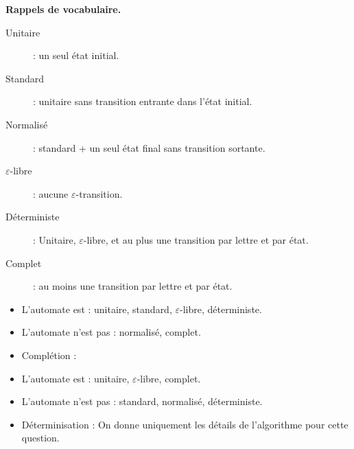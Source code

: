 \begin{corrections}

  \textbf{Rappels de vocabulaire.}
  \begin{description}
  \item[Unitaire] : un seul état initial.
  \item[Standard] : unitaire sans transition entrante dans l'état initial.
  \item[Normalisé] : standard + un seul état final sans transition sortante.
  \item[$\varepsilon$-libre] : aucune $\varepsilon$-transition.
  \item[Déterministe] : Unitaire, $\varepsilon$-libre, et au plus une transition par lettre et par état.
  \item[Complet] : au moins une transition par lettre et par état.
  \end{description}
  
  \begin{questions}

  \item
    \begin{itemize}
    \item L'automate est : unitaire, standard, $\varepsilon$-libre, déterministe.
    \item L'automate n'est pas : normalisé, complet.
    \item Complétion :
    \end{itemize}

  \item 
    \begin{itemize}
    \item L'automate est : unitaire, $\varepsilon$-libre, complet.
    \item L'automate n'est pas : standard, normalisé, déterministe.
    \item Déterminisation : On donne uniquement les détails de l'algorithme pour cette question.
      

\end{itemize}
\end{questions}
\end{corrections}

